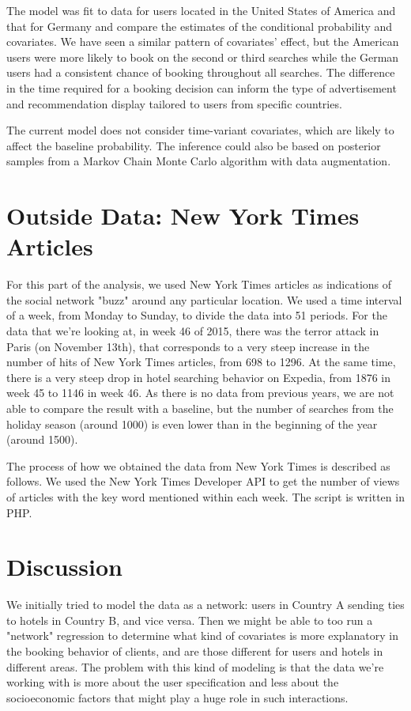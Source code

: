 \documentclass[a4paper]{article}
\begin{document}
The model was fit to data for users located in the United States of America and that for Germany and compare the estimates of the conditional probability and covariates. We have seen a similar pattern of covariates' effect, but the American users were more likely to book on the second or third searches while the German users had a consistent chance of booking throughout all searches. The difference in the time required for a booking decision can inform the type of advertisement and recommendation display tailored to users from specific countries.

The current model does not consider time-variant covariates, which are likely to affect the baseline probability. The inference could also be based on posterior samples from a Markov Chain Monte Carlo algorithm with data augmentation.

\section{Outside Data: New York Times Articles}
For this part of the analysis, we used New York Times articles as indications of the social network "buzz" around any particular location. We used a time interval of a week, from Monday to Sunday, to divide the data into 51 periods. For the data that we're looking at, in week 46 of 2015, there was the terror attack in Paris (on November 13th), that corresponds to a very steep increase in the number of hits of New York Times articles, from 698 to 1296. At the same time, there is a very steep drop in hotel searching behavior on Expedia, from 1876 in week 45 to 1146 in week 46. As there is no data from previous years, we are not able to compare the result with a baseline, but the number of searches from the holiday season (around 1000) is even lower than in the beginning of the year (around 1500).

The process of how we obtained the data from New York Times is described as follows. We used the New York Times Developer API to get the number of views of articles with the key word mentioned within each week. The script is written in PHP.

\section{Discussion}
We initially tried to model the data as a network: users in Country A sending ties to hotels in Country B, and vice versa. Then we might be able to too run a "network" regression to determine what kind of covariates is more explanatory in the booking behavior of clients, and are those different for users and hotels in different areas.  The problem with this kind of modeling is that the data we're working with is more about the user specification and less about the socioeconomic factors that might play a huge role in such interactions.
\end{document}
